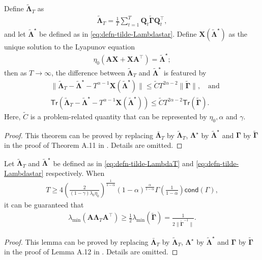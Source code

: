 \begin{customtheorem}\label{thm:Lambda}
Define $\tilde{\bm{\Lambda}}_T$ as 
\begin{align}\label{eq:defn-tilde-LambdaT}
\tilde{\bm{\Lambda}}_T = \frac{1}{T}\sum_{t=1}^T \bm{Q}_t \tilde{\bm{\Gamma}}\bm{Q}_t^\top,
\end{align}
and let $\tilde{\bm{\Lambda}}^\star$ be defined as in \eqref{eq:defn-tilde-Lambdastar}. Define $\bm{X}(\tilde{\bm{\Lambda}}^\star)$ as the unique solution to the Lyapunov equation
\begin{align}\label{eq:defn-X-Lambda}
\eta_0(\bm{AX+XA}^\top) = \tilde{\bm{\Lambda}}^\star;
\end{align}
then as $T \to \infty$, the difference between $\tilde{\bm{\Lambda}}_T$ and $\tilde{\bm{\Lambda}}^\star$ is featured by
\begin{align*}
&\|\tilde{\bm{\Lambda}}_T - \tilde{\bm{\Lambda}}^\star-T^{\alpha-1}\bm{X}(\tilde{\bm{\Lambda}}^\star)\| \leq \widetilde{C}T^{2\alpha-2}\|\tilde{\bm{\Gamma}}\|, \quad \text{and} \\ 
&\mathsf{Tr}(\tilde{\bm{\Lambda}}_T - \tilde{\bm{\Lambda}}^\star-T^{\alpha-1}\bm{X}(\tilde{\bm{\Lambda}}^\star)) \leq \widetilde{C}T^{2\alpha-2} \mathsf{Tr}(\tilde{\bm{\Gamma}}).
\end{align*}
Here, $\widetilde{C}$ is a problem-related quantity that can be represented by $\eta_0,\alpha$ and $\gamma$.
\end{customtheorem}
\begin{proof} 
This theorem can be proved by replacing $\bar{\bm{\Lambda}}_T$ by $\tilde{\bm{\Lambda}}_T$, $\bm{\Lambda}^\star$ by $\tilde{\bm{\Lambda}}^\star$ and $\bm{\Gamma}$ by $\tilde{\bm{\Gamma}}$ in the proof of Theorem A.11 in \cite{wu2024statistical}. Details are omitted.
\end{proof}

\begin{customlemma}\label{thm:A-Lambda}
Let $\tilde{\bm{\Lambda}}_T$ and $\tilde{\bm{\Lambda}}^\star$ be defined as in \eqref{eq:defn-tilde-LambdaT} and \eqref{eq:defn-tilde-Lambdastar} respectively. When 
\begin{align}\label{eq:Lambda-T-condition}
T \geq 4 \left(\frac{2}{(1-\gamma)\lambda_0\eta_0}\right)^{\frac{1}{1-\alpha}}(1-\alpha)^{\frac{\alpha}{1-\alpha}}\Gamma(\frac{1}{1-\alpha})\mathsf{cond}(\Gamma),
\end{align}
it can be guaranteed that
\begin{align*}
\lambda_{\min}(\bm{A}\bm{\Lambda}_T \bm{A}^\top) \geq \frac{1}{2}\lambda_{\min}(\tilde{\bm{\Gamma}}) = \frac{1}{2\|\tilde{\bm{\Gamma}}^{-1}\|}.
\end{align*}
\end{customlemma}
\begin{proof} 
This lemma can be proved by replacing $\bar{\bm{\Lambda}}_T$ by $\tilde{\bm{\Lambda}}_T$, $\bm{\Lambda}^\star$ by $\tilde{\bm{\Lambda}}^\star$ and $\bm{\Gamma}$ by $\tilde{\bm{\Gamma}}$ in the proof of Lemma A.12 in \cite{wu2024statistical}. Details are omitted.
\end{proof}

